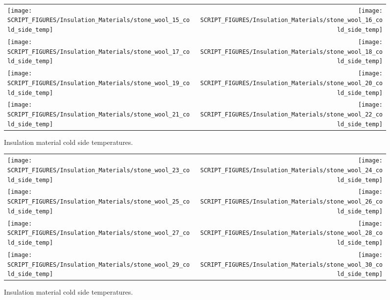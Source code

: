 \begin{figure}[p]
	\begin{tabular*}{\textwidth}{l@{\extracolsep{\fill}}r}
		\texttt{[image: SCRIPT\_FIGURES/Insulation\_Materials/stone\_wool\_15\_cold\_side\_temp]} &
		\texttt{[image: SCRIPT\_FIGURES/Insulation\_Materials/stone\_wool\_16\_cold\_side\_temp]} \\
		\texttt{[image: SCRIPT\_FIGURES/Insulation\_Materials/stone\_wool\_17\_cold\_side\_temp]} &
		\texttt{[image: SCRIPT\_FIGURES/Insulation\_Materials/stone\_wool\_18\_cold\_side\_temp]} \\
		\texttt{[image: SCRIPT\_FIGURES/Insulation\_Materials/stone\_wool\_19\_cold\_side\_temp]} &
		\texttt{[image: SCRIPT\_FIGURES/Insulation\_Materials/stone\_wool\_20\_cold\_side\_temp]} \\
		\texttt{[image: SCRIPT\_FIGURES/Insulation\_Materials/stone\_wool\_21\_cold\_side\_temp]} &
		\texttt{[image: SCRIPT\_FIGURES/Insulation\_Materials/stone\_wool\_22\_cold\_side\_temp]}
	\end{tabular*}
	\caption[Insulation material cold side temperatures]{Insulation material cold side temperatures.}
\end{figure}

\begin{figure}[p]
	\begin{tabular*}{\textwidth}{l@{\extracolsep{\fill}}r}
		\texttt{[image: SCRIPT\_FIGURES/Insulation\_Materials/stone\_wool\_23\_cold\_side\_temp]} &
		\texttt{[image: SCRIPT\_FIGURES/Insulation\_Materials/stone\_wool\_24\_cold\_side\_temp]} \\
		\texttt{[image: SCRIPT\_FIGURES/Insulation\_Materials/stone\_wool\_25\_cold\_side\_temp]} &
		\texttt{[image: SCRIPT\_FIGURES/Insulation\_Materials/stone\_wool\_26\_cold\_side\_temp]} \\
		\texttt{[image: SCRIPT\_FIGURES/Insulation\_Materials/stone\_wool\_27\_cold\_side\_temp]} &
		\texttt{[image: SCRIPT\_FIGURES/Insulation\_Materials/stone\_wool\_28\_cold\_side\_temp]} \\
		\texttt{[image: SCRIPT\_FIGURES/Insulation\_Materials/stone\_wool\_29\_cold\_side\_temp]} &
		\texttt{[image: SCRIPT\_FIGURES/Insulation\_Materials/stone\_wool\_30\_cold\_side\_temp]}
	\end{tabular*}
	\caption[Insulation material cold side temperatures]{Insulation material cold side temperatures.}
\end{figure}

